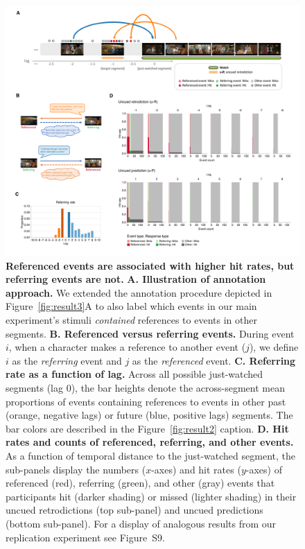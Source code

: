 \documentclass[10pt]{article}
\newcommand{\referringReferenced}{S9}
\begin{document}
\begin{figure}[tp]
  \centering
  \includegraphics[width=\textwidth]{results5}

  \caption{\textbf{Referenced events are associated with higher hit rates, but
  referring events are not.} \textbf{A. Illustration of annotation approach.}
  We extended the annotation procedure depicted in Figure~\ref{fig:result3}A to
  also label which events in our main experiment's stimuli \textit{contained}
  references to events in other segments. \textbf{B. Referenced versus
  referring events.} During event $i$, when a character makes a reference to
  another event ($j$), we define $i$ as the \textit{referring} event and $j$ as
  the \textit{referenced} event. \textbf{C. Referring rate as a function of
  lag.} Across all possible just-watched segments (lag 0), the bar heights
  denote the across-segment mean proportions of events containing references to
  events in other past (orange, negative lags) or future (blue, positive lags)
  segments. The bar colors are described in the Figure~\ref{fig:result2}
  caption. \textbf{D. Hit rates and counts of referenced, referring, and other
  events.} As a function of temporal distance to the just-watched segment, the
  sub-panels display the numbers ($x$-axes) and hit rates ($y$-axes) of
  referenced (red), referring (green), and other (gray) events that
  participants hit (darker shading) or missed (lighter shading) in their uncued
  retrodictions (top sub-panel) and uncued predictions (bottom sub-panel). For
  a display of analogous results from our replication experiment see
  Figure~\referringReferenced.}

  \label{fig:result5}
\end{figure}
\end{document}
